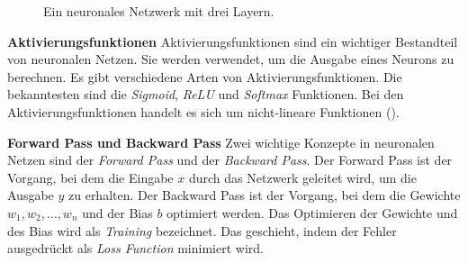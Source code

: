 \documentclass[11pt,a4paper]{article}
\begin{document}
\begin{figure}[h!]
	\centering
	\caption{Ein neuronales Netzwerk mit drei Layern.}
	\label{fig:neural_network}
\end{figure}


\noindent \newline \textbf{Aktivierungsfunktionen} \newline
Aktivierungsfunktionen sind ein wichtiger Bestandteil von neuronalen Netzen. Sie werden verwendet,
um die Ausgabe eines Neurons zu berechnen. Es gibt verschiedene Arten von Aktivierungsfunktionen.
Die bekanntesten sind die \textit{Sigmoid}, \textit{ReLU} und \textit{Softmax} Funktionen. Bei den 
Aktivierungsfunktionen handelt es sich um nicht-lineare Funktionen (\cite{weidman2019deep}).


\noindent \newline \textbf{Forward Pass und Backward Pass} \newline
Zwei wichtige Konzepte in neuronalen Netzen sind der \textit{Forward Pass} und der
\textit{Backward Pass}. Der Forward Pass ist der Vorgang, bei dem die Eingabe \(x\) durch das
Netzwerk geleitet wird, um die Ausgabe \(y\) zu erhalten. Der Backward Pass ist der Vorgang, bei
dem die Gewichte \(w_{1}, w_{2}, \dots, w_{n}\) und der Bias \(b\) optimiert werden. Das Optimieren
der Gewichte und des Bias wird als \textit{Training} bezeichnet. Das geschieht, indem der Fehler 
ausgedrückt als \textit{Loss Function} minimiert wird.
\end{document}

